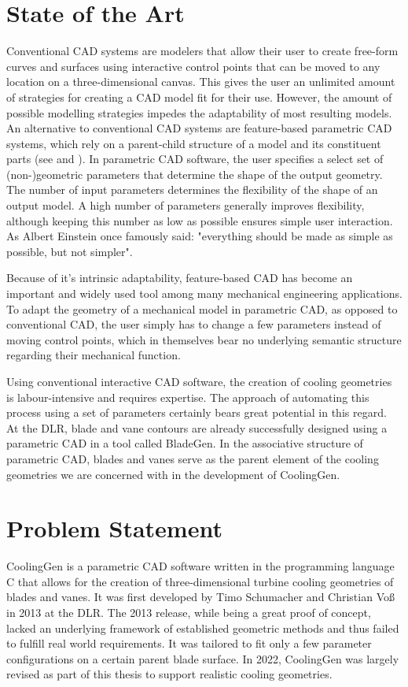\documentclass[a4paper, 11pt]{report}
\theoremstyle{definition}
\begin{document}
	\section{State of the Art}
		Conventional CAD systems are modelers that allow their user to create free-form curves and surfaces using interactive control points that can be moved to any location on a three-dimensional canvas. This gives the user an unlimited amount of strategies for creating a CAD model fit for their use. However, the amount of possible modelling strategies impedes the adaptability of most resulting models. An alternative to conventional CAD systems are feature-based parametric CAD systems, which rely on a parent-child structure of a model and its constituent parts (see \cite{Shah1995} and \cite{Camba2016}). In parametric CAD software, the user specifies a select set of (non-)geometric parameters that determine the shape of the output geometry. The number of input parameters determines the flexibility of the shape of an output model. A high number of parameters generally improves flexibility, although keeping this number as low as possible ensures simple user interaction. As Albert Einstein once famously said: "everything should be made as simple as possible, but not simpler". 

		Because of it's intrinsic adaptability, feature-based CAD has become an important and widely used tool among many mechanical engineering applications. To adapt the geometry of a mechanical model in parametric CAD, as opposed to conventional CAD, the user simply has to change a few parameters instead of moving control points, which in themselves bear no underlying semantic structure regarding their mechanical function.

		Using conventional interactive CAD software, the creation of cooling geometries is labour-intensive and requires expertise. The approach of automating this process using a set of parameters certainly bears great potential in this regard. At the DLR, blade and vane contours are already successfully designed using a parametric CAD in a tool called BladeGen. In the associative structure of parametric CAD, blades and vanes serve as the parent element of the cooling geometries we are concerned with in the development of CoolingGen.

	\section{Problem Statement}
		CoolingGen is a parametric CAD software written in the programming language C that allows for the creation of three-dimensional turbine cooling geometries of blades and vanes. It was first developed by Timo Schumacher and Christian Voß in 2013 at the DLR. The 2013 release, while being a great proof of concept, lacked an underlying framework of established geometric methods and thus failed to fulfill real world requirements. It was tailored to fit only a few parameter configurations on a certain parent blade surface. In 2022, CoolingGen was largely revised as part of this thesis to support realistic cooling geometries.
\end{document}

